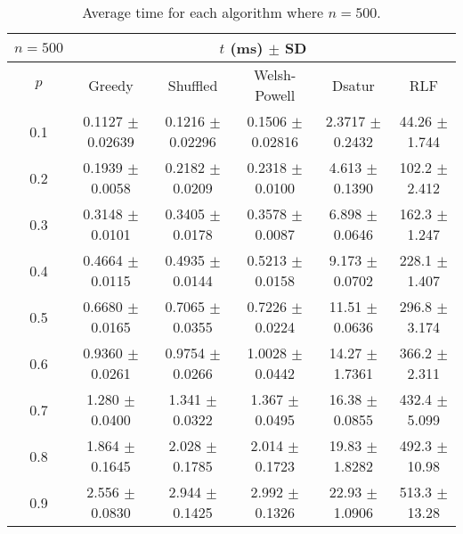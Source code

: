\begin{table}[H]
    \centering
    \begin{tabular}{cccccc}
        
        $n = 500$& \multicolumn{5}{c}{$t$ (\unit{ms}) $\pm$ SD} \\
        \hline
        $p$ & Greedy & Shuffled & Welsh-Powell & Dsatur & RLF \\
        \hline
        0.1 & 0.1127 $\pm$ 0.02639 & 0.1216 $\pm$ 0.02296 & 0.1506 $\pm$ 0.02816 & 2.3717 $\pm$ 0.2432 & 44.26 $\pm$ 1.744 \\
        0.2 & 0.1939 $\pm$ 0.0058 & 0.2182 $\pm$ 0.0209 & 0.2318 $\pm$ 0.0100 & 4.613 $\pm$ 0.1390 & 102.2 $\pm$ 2.412 \\
        0.3 & 0.3148 $\pm$ 0.0101 & 0.3405 $\pm$ 0.0178 & 0.3578 $\pm$ 0.0087 & 6.898 $\pm$ 0.0646 & 162.3 $\pm$ 1.247 \\
        0.4 & 0.4664 $\pm$ 0.0115 & 0.4935 $\pm$ 0.0144 & 0.5213 $\pm$ 0.0158 & 9.173 $\pm$ 0.0702 & 228.1 $\pm$ 1.407 \\
        0.5 & 0.6680 $\pm$ 0.0165 & 0.7065 $\pm$ 0.0355 & 0.7226 $\pm$ 0.0224 & 11.51 $\pm$ 0.0636 & 296.8 $\pm$ 3.174 \\
        0.6 & 0.9360 $\pm$ 0.0261 & 0.9754 $\pm$ 0.0266 & 1.0028 $\pm$ 0.0442 & 14.27 $\pm$ 1.7361 & 366.2 $\pm$ 2.311 \\
        0.7 & 1.280 $\pm$ 0.0400 & 1.341 $\pm$ 0.0322 & 1.367 $\pm$ 0.0495 & 16.38 $\pm$ 0.0855 & 432.4 $\pm$ 5.099 \\
        0.8 & 1.864 $\pm$ 0.1645 & 2.028 $\pm$ 0.1785 & 2.014 $\pm$ 0.1723 & 19.83 $\pm$ 1.8282 & 492.3 $\pm$ 10.98 \\
        0.9 & 2.556 $\pm$ 0.0830 & 2.944 $\pm$ 0.1425 & 2.992 $\pm$ 0.1326 & 22.93 $\pm$ 1.0906 & 513.3 $\pm$ 13.28 \\

        \hline
    \end{tabular}
    \caption{Average time for each algorithm where $n = 500$.}
    \label{tab:avgTimeforV500}
\end{table}



